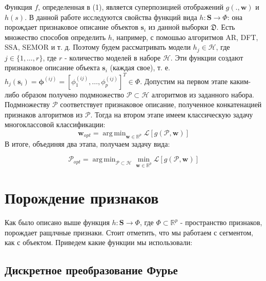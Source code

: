 \documentclass[12pt,twoside]{article}
\DeclareMathOperator*{\argmin}{arg\,min}
\begin{document}
Функция $f$, определенная в (1), является суперпозицией отображений $g(. , \mathbf{w})$ и $h(s)$. В данной работе исследуются свойства функций вида  $h: \mathbf{S} \rightarrow \Phi$: она порождает признаковое описание объектов $\mathbf{s}_i$ из данной выборки $\mathfrak{D}$.  Есть множество способов определить $h$, например, с помошью алгоритмов AR, DFT, SSA, SEMOR и т. д. Поэтому будем рассматривать модели $h_j \in \mathcal{H}$, где $j \in \{1, \dots, r\}$, где $r$  - количество моделей в наборе $\mathcal{H}$. Эти функции создают признаковое описание объекта $\mathbf{s}_i$ (каждая свое),  т. е.
$h_j(\mathbf{s}_i)  = \boldsymbol{\phi}^{(i j)} =[\phi_{1}^{(i j)}, \dots, \phi_{p}^{(i j)}] ^T \in \Phi$. 
Допустим на первом этапе каким-либо образом получено подмножество $\mathcal{P} \subset \mathcal{H}$ алгоритмов из заданного набора. Подмножеству $\mathcal{P}$ соответствует признаковое описание, полученное конкатенацией признаков алгоритмов из $\mathcal{P}$. Тогда на втором этапе имеем классическую задачу многоклассовой классификации:
\begin{equation}
\mathbf{w}_{opt} = \argmin_{\mathbf{w} \in \mathbb{R}^p} \mathcal{L}[g(\mathcal{P}, \mathbf{w})]
\end{equation}
В итоге, объединяя два этапа, получаем задачу вида:

\begin{equation}
\mathbf{\mathcal{P}}_{opt} = \argmin_{\mathcal{P}\subset \mathcal{H}} \min_{\mathbf{w} \in \mathbb{R}^p}\mathcal{L}\left[g(\mathcal{P}, \mathbf{w})\right]
\end{equation}

\section{Порождение признаков}

Как было описано выше функция $h: \mathbf{S} \rightarrow \Phi$, где $\Phi \subset \mathbb{R}^p$ - пространство признаков, порождает ращлчные признаки. Стоит отметить, что мы работаем с сегментом, как с объектом. Приведем какие функции мы использовали: 

\subsection{Дискретное преобразование Фурье}
\end{document}
